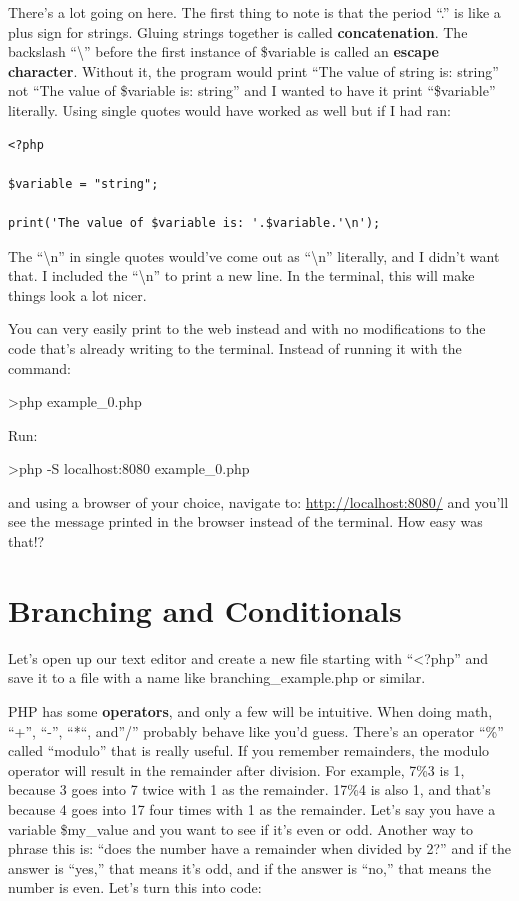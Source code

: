 \documentclass[
]{book}
\begin{document}
There's a lot going on here. The first thing to note is that the period ``.'' is like a plus sign for strings. Gluing strings together is called \textbf{concatenation}. The backslash ``\textbackslash{}'' before the first instance of \$variable is called an \textbf{escape character}. Without it, the program would print ``The value of string is: string'' not ``The value of \$variable is: string'' and I wanted to have it print ``\$variable'' literally. Using single quotes would have worked as well but if I had ran:

\begin{verbatim}
<?php

$variable = "string";

print('The value of $variable is: '.$variable.'\n');
\end{verbatim}

The ``\textbackslash n'' in single quotes would've come out as ``\textbackslash n'' literally, and I didn't want that. I included the ``\textbackslash n'' to print a new line. In the terminal, this will make things look a lot nicer.

You can very easily print to the web instead and with no modifications to the code that's already writing to the terminal. Instead of running it with the command:

\textgreater php example\_0.php

Run:

\textgreater php -S localhost:8080 example\_0.php

and using a browser of your choice, navigate to: \url{http://localhost:8080/} and you'll see the message printed in the browser instead of the terminal. How easy was that!?

\hypertarget{branching}{%
\chapter{Branching and Conditionals}\label{branching}}

Let's open up our text editor and create a new file starting with ``\textless?php'' and save it to a file with a name like branching\_example.php or similar.

PHP has some \textbf{operators}, and only a few will be intuitive. When doing math, ``+'', ``-'', ``*``, and''/'' probably behave like you'd guess. There's an operator ``\%'' called ``modulo'' that is really useful. If you remember remainders, the modulo operator will result in the remainder after division. For example, 7\%3 is 1, because 3 goes into 7 twice with 1 as the remainder. 17\%4 is also 1, and that's because 4 goes into 17 four times with 1 as the remainder. Let's say you have a variable \$my\_value and you want to see if it's even or odd. Another way to phrase this is: ``does the number have a remainder when divided by 2?'' and if the answer is ``yes,'' that means it's odd, and if the answer is ``no,'' that means the number is even. Let's turn this into code:
\end{document}
